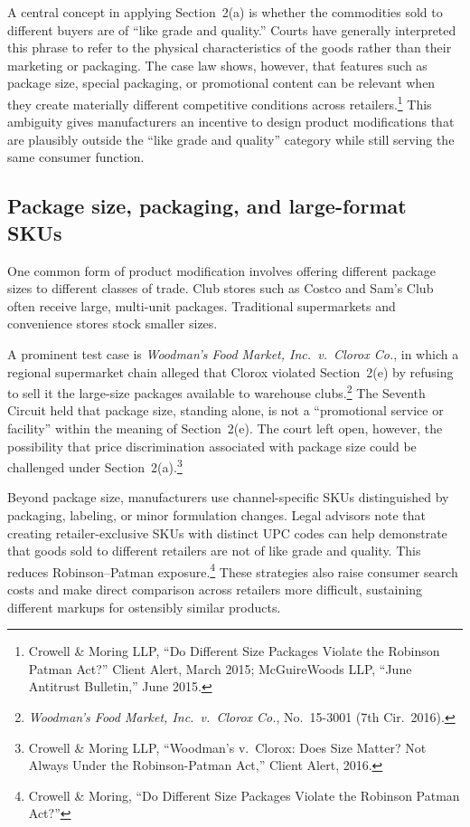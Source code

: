 \documentclass[12pt]{article}
\theoremstyle{definition}
\begin{document}
A central concept in applying Section~2(a) is whether the commodities sold to different buyers are of ``like grade and quality.''
Courts have generally interpreted this phrase to refer to the physical characteristics of the goods rather than their marketing or packaging.
The case law shows, however, that features such as package size, special packaging, or promotional content can be relevant when they create materially different competitive conditions across retailers.\footnote{Crowell \& Moring LLP, ``Do Different Size Packages Violate the Robinson Patman Act?'' Client Alert, March 2015; McGuireWoods LLP, ``June Antitrust Bulletin,'' June 2015.}
This ambiguity gives manufacturers an incentive to design product modifications that are plausibly outside the ``like grade and quality'' category while still serving the same consumer function.

\subsection{Package size, packaging, and large-format SKUs}

One common form of product modification involves offering different package sizes to different classes of trade.
Club stores such as Costco and Sam's Club often receive large, multi-unit packages. Traditional supermarkets and convenience stores stock smaller sizes.

A prominent test case is \textit{Woodman's Food Market, Inc.\ v.\ Clorox Co.}, in which a regional supermarket chain alleged that Clorox violated Section~2(e) by refusing to sell it the large-size packages available to warehouse clubs.\footnote{\textit{Woodman's Food Market, Inc.\ v.\ Clorox Co.}, No.\ 15-3001 (7th Cir.\ 2016).}
The Seventh Circuit held that package size, standing alone, is not a ``promotional service or facility'' within the meaning of Section~2(e).
The court left open, however, the possibility that price discrimination associated with package size could be challenged under Section~2(a).\footnote{Crowell \& Moring LLP, ``Woodman's v.\ Clorox: Does Size Matter? Not Always Under the Robinson-Patman Act,'' Client Alert, 2016.}

Beyond package size, manufacturers use channel-specific SKUs distinguished by packaging, labeling, or minor formulation changes.
Legal advisors note that creating retailer-exclusive SKUs with distinct UPC codes can help demonstrate that goods sold to different retailers are not of like grade and quality. This reduces Robinson--Patman exposure.\footnote{Crowell \& Moring, ``Do Different Size Packages Violate the Robinson Patman Act?''}
These strategies also raise consumer search costs and make direct comparison across retailers more difficult, sustaining different markups for ostensibly similar products.
\end{document}
